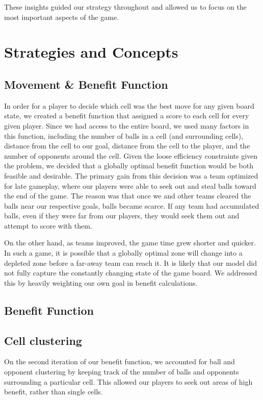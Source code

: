\documentclass[
10pt, %
letterpaper, %
oneside, %
headinclude,footinclude, %
english
]{article}
\begin{document}
These insights guided our strategy throughout and allowed us to focus on the most important aspects of the game.

\section{Strategies and Concepts}

\subsection {Movement \& Benefit Function}

In order for a player to decide which cell was the best move for any given board state, we created a benefit function that assigned a score to each cell for every given player. Since we had access to the entire board, we used many factors in this function, including the number of balls in a cell (and surrounding cells), distance from the cell to our goal, distance from the cell to the player, and the number of opponents around the cell. Given the loose efficiency constraints given the problem, we decided that a globally optimal benefit function would be both feasible and desirable. The primary gain from this decision was a team optimized for late gameplay, where our players were able to seek out and steal balls toward the end of the game. The reason was that once we and other teams cleared the balls near our respective goals, balls became scarce. If any team had accumulated balls, even if they were far from our players, they would seek them out and attempt to score with them.

On the other hand, as teams improved, the game time grew shorter and quicker. In such a game, it is possible that a globally optimal zone will change into a depleted zone before a far-away team can reach it. It is likely that our model did not fully capture the constantly changing state of the game board. We addressed this by heavily weighting our own goal in benefit calculations.

\subsection{Benefit Function}

\subsection{Cell clustering}
On the second iteration of our benefit function, we accounted for ball and opponent clustering by keeping track of the number of balls and opponents surrounding a particular cell. This allowed our players to seek out areas of high benefit, rather than single cells. 
\end{document}
